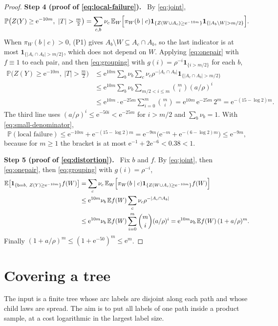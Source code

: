 \documentclass[11pt]{article}
\numberwithin{equation}{section}
\newcommand{\PP}{\mathbb P}
\newcommand{\EE}{\mathbb E}
\newcommand{\ind}{\mathbf 1}
\newcommand{\ee}{\mathrm e}
\newcommand{\tgt}{\mathsf b}
\newcommand{\step}[2]{\par\medskip\noindent\textbf{Step #1 (#2).}\ }
\begin{document}
\begin{proof}
\step{4}{proof of \eqref{eq:local-failure}}
By \eqref{eq:joint},
\[
 \PP\bigl(Z(Y)\ge\ee^{-10m},\ |T|>\tfrac m2\bigr)
 =\sum_{c,b}\nu_c\,\EE_W\Bigl[\pi_W(b\mid c)
   \ind_{\{Z(W\cup A_c)\ge\ee^{-10m}\}}
   \ind_{\{|A_b\setminus W|>m/2\}}\Bigr].
\]
When $\pi_W(b\mid c)>0$, (P1) gives
$A_b\setminus W\subseteq A_c\cap A_b$, so the last indicator is at most
$\ind_{\{|A_c\cap A_b|>m/2\}}$, which does not depend on $W$. Applying
\eqref{eq:onepair} with $f\equiv1$ to each pair, and then
\eqref{eq:grouping} with $g(i)=\rho^{-i}\ind_{\{i>m/2\}}$ for each $b$,
\begin{align*}
 \PP\bigl(Z(Y)\ge\ee^{-10m},\ |T|>\tfrac m2\bigr)
 &\le\ee^{10m}\sum_b\nu_b\sum_c\nu_c
 \rho^{-|A_c\cap A_b|}\ind_{\{|A_c\cap A_b|>m/2\}}\\
 &\le\ee^{10m}\sum_b\nu_b\sum_{m/2<i\le m}\binom mi(a/\rho)^i\\
 &\le \ee^{10m}\cdot\ee^{-25m}\sum_{i=0}^m\binom mi
 =\ee^{10m}\,\ee^{-25m}\,2^m=\ee^{-(15-\log2)m}.
\end{align*}
The third line uses $(a/\rho)^i\le\ee^{-50i}<\ee^{-25m}$ for $i>m/2$
and $\sum_b\nu_b=1$. With \eqref{eq:small-denominator},
\[
 \PP(\text{local failure})
 \le\ee^{-10m}+\ee^{-(15-\log 2)m}
 =\ee^{-9m}\bigl(\ee^{-m}+\ee^{-(6-\log2)m}\bigr)
 \le\ee^{-9m},
\]
because for $m\ge1$ the bracket is at most
$\ee^{-1}+2\ee^{-6}<0.38<1$.

\step{5}{proof of \eqref{eq:distortion}}
Fix $b$ and $f$. By \eqref{eq:joint}, then \eqref{eq:onepair}, then
\eqref{eq:grouping} with $g(i)=\rho^{-i}$,
\begin{align*}
 \EE\!\left[
 \ind_{\{\tgt=b,\ Z(Y)\ge\ee^{-10m}\}} f(W)\right]
 &=\sum_c\nu_c\,\EE_W\Bigl[\pi_W(b\mid c)
   \ind_{\{Z(W\cup A_c)\ge\ee^{-10m}\}}f(W)\Bigr]\\
 &\le\ee^{10m}\nu_b\,\EE f(W)\sum_c\nu_c\rho^{-|A_c\cap A_b|}\\
 &\le\ee^{10m}\nu_b\,\EE f(W)\sum_{i=0}^m\binom mi(a/\rho)^i
 =\ee^{10m}\nu_b\,\EE f(W)\,(1+a/\rho)^m .
\end{align*}
Finally $(1+a/\rho)^m\le(1+\ee^{-50})^m\le\ee^m$.
\end{proof}

\section{Covering a tree}\label{sec:trees}

The input is a finite tree whose arc labels are disjoint along each
path and whose child laws are spread. The aim is to put all labels of
one path inside a product sample, at a cost logarithmic in the largest
label size.
\end{document}
